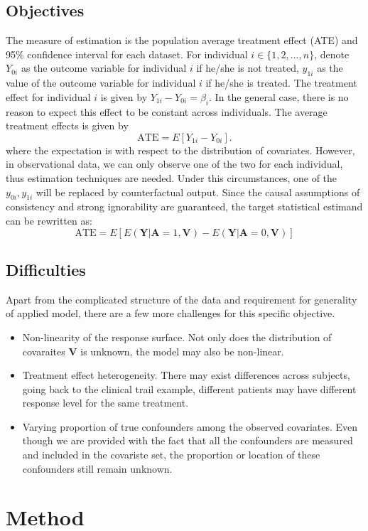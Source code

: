 \documentclass[12pt, oneside]{article}
\newcommand{\bA}{\mathbf{A}}
\newcommand{\bY}{\mathbf{Y}}
\newcommand{\bV}{\mathbf{V}}
\begin{document}
\subsection{Objectives}
The measure of estimation is the population average treatment effect (ATE) and 95\% confidence interval for each dataset. For individual $i \in \{1,2,\ldots,n\}$, denote $Y_{0i}$ as the outcome variable for individual $i$ if he/she is not treated, $y_{1i}$ as the value of the outcome variable for individual $i$ if he/she is treated. The treatment effect for individual $i$ is given by $Y_{1i}-Y_{0i}=\beta_i$. In the general case, there is no reason to expect this effect to be constant across individuals. The average treatment effects is given by 
$$\mbox{ATE}=E[Y_{1i}-Y_{0i}].$$
where the expectation is with respect to the distribution of covariates. However, in observational data, we can only observe one of the two for each individual, thus estimation techniques are needed. Under this circumstances, one of the $y_{0i},y_{1i}$ will be replaced by counterfactual output. Since the causal assumptions of consistency and strong ignorability are guaranteed, the target statistical estimand can be rewritten as:
$$\mbox{ATE}=E[E(\bY | \bA = 1, \bV) - E(\bY | \bA = 0, \bV)]$$

\subsection{Difficulties}
Apart from the complicated structure of the data and requirement for generality of applied model, there are a few more challenges for this specific objective.
\begin{itemize}
\setlength\itemsep{-0.5em}
\item Non-linearity of the response surface. Not only does the distribution of covaraites $\bV$ is unknown, the model may also be non-linear. 
\item Treatment effect heterogeneity. There may exist differences across subjects, going back to the clinical trail example, different patients may have different response level for the same treatment. 
\item Varying proportion of true confounders among the observed covariates. Even though we are provided with the fact that all the confounders are measured and included in the covariste set, the proportion or location of these confounders still remain unknown. 
\end{itemize}
    
\section{Method}\label{sec:method}
\end{document}
